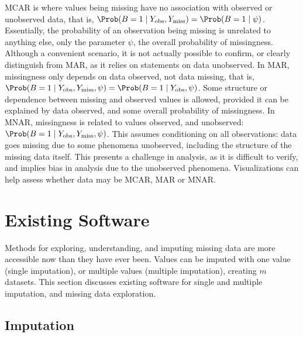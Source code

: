 \documentclass[article]{jss}
\begin{document}
MCAR is where values being missing have no association with
observed or unobserved data, that is, \(\Prob(B = 1 \mid Y_\text{obs}, Y_\text{miss}) = \Prob(B
= 1 \mid \psi)\).  Essentially, the probability of an observation being missing
is unrelated to anything else, only the parameter \(\psi\), the overall
probability of missingness.  Although a convenient scenario, it is not
actually possible to confirm, or clearly distinguish from MAR, as it relies
on statements on data unobserved.  In MAR, missingness only depends
on data observed, not data missing, that is, \(\Prob(B = 1 \mid Y_\text{obs}, Y_\text{miss},
\psi) = \Prob(B = 1 \mid Y_\text{obs}, \psi)\).  Some structure or dependence between
missing and observed values is allowed, provided it can be explained by data
observed, and some overall probability of missingness.  In MNAR,
missingness is related to values observed, and unobserved: \(\Prob(B = 1 \mid
Y_\text{obs}, Y_\text{miss}, \psi)\).  This assumes conditioning on all observations:
data goes missing due to some phenomena unobserved, including the structure
of the missing data itself.  This presents a challenge in analysis, as it is
difficult to verify, and implies bias in analysis due to the unobserved
phenomena.  Visualizations can help assess whether data may be MCAR, MAR or
MNAR.

\hypertarget{existing-software}{%
\section{Existing Software}\label{existing-software}}

Methods for exploring, understanding, and imputing missing data are more
accessible now than they have ever been.  Values can be imputed with one
value (single imputation), or multiple values (multiple imputation),
creating \(m\) datasets.  This section discusses existing software for
single and multiple imputation, and missing data exploration.

\hypertarget{imputation}{%
\subsection{Imputation}\label{imputation}}
\end{document}
